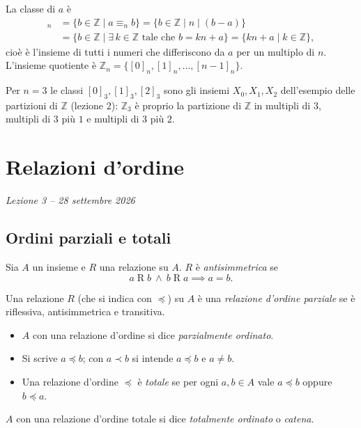 \documentclass[11pt,a4paper]{article}
\begin{document}
La classe di $a$ è
\begin{align*}
[a]_n &= \{b \in \mathbb{Z} \mid a \equiv_n b\}
       = \{b \in \mathbb{Z} \mid n \mid (b - a)\} \\
      &= \{b \in \mathbb{Z} \mid \exists\, k \in \mathbb{Z} \text{ tale
         che } b = kn + a\}
       = \{kn + a \mid k \in \mathbb{Z}\},
\end{align*}
cioè è l'insieme di tutti i numeri che differiscono da $a$ per un multiplo
di $n$. L'insieme quotiente è
$\mathbb{Z}_n = \{[0]_n, [1]_n, \dots, [n-1]_n\}$.

\begin{esempio}
Per $n = 3$ le classi $[0]_3, [1]_3, [2]_3$ sono gli insiemi $X_0, X_1,
X_2$ dell'esempio delle partizioni di $\mathbb{Z}$ (lezione 2): $\mathbb{Z}_3$ è proprio la partizione
di $\mathbb{Z}$ in multipli di $3$, multipli di $3$ più $1$ e multipli di
$3$ più $2$.
\end{esempio}

\section[Relazioni d'ordine (Lezione 3 -- 28 settembre 2026)]{Relazioni d'ordine}
\noindent\emph{Lezione 3 -- 28 settembre 2026}
\subsection{Ordini parziali e totali}

\begin{definizione}
Sia $A$ un insieme e $R$ una relazione su $A$. $R$ è
\emph{antisimmetrica} se
\[
a \mathrel{R} b \ \land\ b \mathrel{R} a \implies a = b.
\]
\end{definizione}

\begin{definizione}
Una relazione $R$ (che si indica con $\preceq$) su $A$ è una
\emph{relazione d'ordine parziale} se è riflessiva, antisimmetrica e
transitiva.
\end{definizione}

\begin{itemize}
    \item $A$ con una relazione d'ordine si dice \emph{parzialmente
          ordinato}.
    \item Si scrive $a \preceq b$; con $a \prec b$ si intende
          $a \preceq b$ e $a \neq b$.
    \item Una relazione d'ordine $\preceq$ è \emph{totale} se per ogni
          $a, b \in A$ vale $a \preceq b$ oppure $b \preceq a$.
\end{itemize}
$A$ con una relazione d'ordine totale si dice \emph{totalmente ordinato}
o \emph{catena}.
\end{document}
